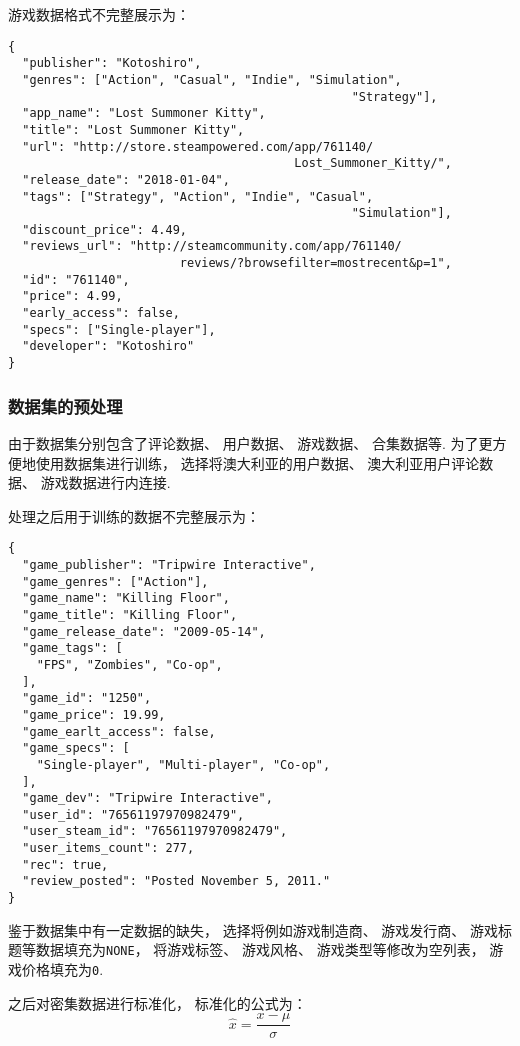 游戏数据格式不完整展示为：
\begin{verbatim}
{
  "publisher": "Kotoshiro",
  "genres": ["Action", "Casual", "Indie", "Simulation", 
                                                "Strategy"],
  "app_name": "Lost Summoner Kitty",
  "title": "Lost Summoner Kitty",
  "url": "http://store.steampowered.com/app/761140/
                                        Lost_Summoner_Kitty/",
  "release_date": "2018-01-04",
  "tags": ["Strategy", "Action", "Indie", "Casual", 
                                                "Simulation"],
  "discount_price": 4.49,
  "reviews_url": "http://steamcommunity.com/app/761140/
                        reviews/?browsefilter=mostrecent&p=1",
  "id": "761140",
  "price": 4.99,
  "early_access": false,
  "specs": ["Single-player"],
  "developer": "Kotoshiro"
}
\end{verbatim}

\subsubsection{数据集的预处理}

由于数据集分别包含了评论数据、
用户数据、
游戏数据、
合集数据等.
为了更方便地使用数据集进行训练，
选择将澳大利亚的用户数据、
澳大利亚用户评论数据、
游戏数据进行内连接.

处理之后用于训练的数据不完整展示为：
\begin{verbatim}
{
  "game_publisher": "Tripwire Interactive",
  "game_genres": ["Action"],
  "game_name": "Killing Floor",
  "game_title": "Killing Floor",
  "game_release_date": "2009-05-14",
  "game_tags": [
    "FPS", "Zombies", "Co-op",
  ],
  "game_id": "1250",
  "game_price": 19.99,
  "game_earlt_access": false,
  "game_specs": [
    "Single-player", "Multi-player", "Co-op",
  ],
  "game_dev": "Tripwire Interactive",
  "user_id": "76561197970982479",
  "user_steam_id": "76561197970982479",
  "user_items_count": 277,
  "rec": true,
  "review_posted": "Posted November 5, 2011."
}
\end{verbatim}

鉴于数据集中有一定数据的缺失，
选择将例如游戏制造商、
游戏发行商、
游戏标题等数据填充为\verb|NONE|，
将游戏标签、
游戏风格、
游戏类型等修改为空列表，
游戏价格填充为\verb|0|.

之后对密集数据进行标准化，
标准化的公式为：
\begin{equation}
  \hat{x} = \frac{x-\mu}{\sigma}
\end{equation}

